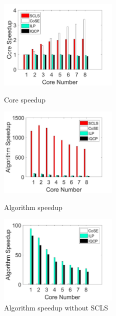 \begin{figure}[tp]
\centering
\begin{minipage}[t]{0.3\linewidth}
\centering
\includegraphics[width=2.25in]{franz/speedup}
\caption{Core speedup}
\label{fig:Speedup}
\end{minipage}
\hfill
\begin{minipage}[t]{0.3\linewidth}
\centering
\includegraphics[width=2.25in]{franz/Multiple}
\caption{Algorithm speedup}
\label{fig:Multiple}
\end{minipage}
\hfill
\begin{minipage}[t]{0.3\linewidth}
\centering
\includegraphics[width=2.25in]{franz/MultipleNoSCLS}
\caption{Algorithm speedup without SCLS}
\label{fig:MultipleNoSCLS}
\end{minipage}
\end{figure}


%

